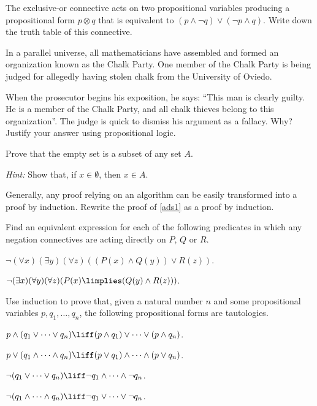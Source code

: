 

\begin{exercises}
\item The exclusive-or connective acts on two propositional variables producing a propositional form $p\otimes q$ that is equivalent to $(p\land \lnot q) \lor (\lnot p \land q)$. Write down the truth table of this connective.

\item In a parallel universe, all mathematicians have assembled and formed an organization known as the Chalk Party. One member of the Chalk Party is being judged for allegedly having stolen chalk from the University of Oviedo.

When the prosecutor begins his exposition, he says: ``This man is clearly guilty. He is a member of the Chalk Party, and all chalk thieves belong to this organization''. The judge is quick to dismiss his argument as a fallacy. Why? Justify your answer using propositional logic. 

\item Prove that the empty set is a subset of any set $A$.

\emph{Hint:} Show that, if $x\in \emptyset$, then $x\in A$.

\item Generally, any proof relying on an algorithm can be easily transformed into a proof by induction. Rewrite the proof of \ref{ads1} as a proof by induction.

\item Find an equivalent expression for each of the following predicates in which any negation connectives are acting directly on $P$, $Q$ or $R$.
\begin{lettered}
\item $\lnot (\forall x)(\exists y)(\forall z)( (P(x) \land Q(y))\lor R(z))$.
\item $\lnot (\exists x)(\forall y) (\forall z) ( P(x) \limplies (Q(y) \land R(z)))$.
\end{lettered}

\item Use induction to prove that, given a natural number $n$ and some propositional variables $p, q_1,\ldots,q_n$, the following propositional forms are tautologies.
\begin{lettered}
\item $p \land (q_1 \lor \cdots \lor q_n) \liff (p\land q_1) \lor \cdots \lor (p \land q_n)$.
\item $p \lor (q_1 \land \cdots \land q_n) \liff (p\lor q_1) \land \cdots \land (p \lor q_n)$.
\item $\lnot(q_1\lor \cdots \lor q_n) \liff \lnot q_1 \land \cdots \land \lnot q_n$. 
\item $\lnot(q_1\land \cdots \land q_n) \liff \lnot q_1 \lor \cdots \lor \lnot q_n$. 
\end{lettered}



\end{exercises}
